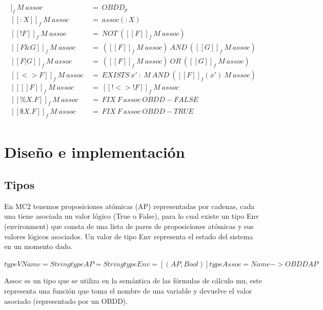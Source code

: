 \begin{align*}
[[p]]_{f}\ M\ assoc\ &=\ OBDD_{p} \\
[[:X]]_{f}\ M\ assoc\ &=\ assoc(:X) \\
[[!F]]_{f}\ M\ assoc\ &=\ NOT\ ([[F]]_{f}\ M\ assoc)\\
[[F \& G]]_{f}\ M\ assoc\ &=\ ([[F]]_{f}\ M\ assoc)\ AND\ ([[G]]_{f}\ M\ assoc)\\
[[F | G]]_{f}\ M\ assoc\ &=\ ([[F]]_{f}\ M\ assoc)\ OR\ ([[G]]_{f}\ M\ assoc)\\
[[<>F]]_{f}\ M\ assoc\ &=\ EXISTS\ x'\ :\ M\ AND\ ([[F]]_{f}(x')\ M\ assoc) \\
[[[]F]]_{f}\ M\ assoc\ &=\ [[!<>!F]]_{f}\ M\ assoc \\
[[\%X.F]]_{f}\ M\ assoc\ &=\ FIX\ F\ assoc\ OBDD-FALSE \\
[[\$X.F]]_{f}\ M\ assoc\ &=\ FIX\ F\ assoc\ OBDD-TRUE \\
\end{align*}




\section{Diseño e implementación}

\subsection{Tipos}
En MC2 tenemos proposiciones atómicas (AP) representadas por cadenas, cada una tiene asociada un valor lógico (True o False), para lo cual existe un tipo Env (environment) que consta de una lista de pares de proposiciones atómicas y sus valores lógicos asociados. Un valor de tipo Env representa el estado del sistema en un momento dado.

$type VName = String
type AP = String
type Env = [(AP,Bool)]
type Assoc = Name -> OBDD AP$

Assoc es un tipo que se utiliza en la semántica de las fórmulas de cálculo mu, este representa una función que toma el nombre de una variable y devuelve el valor asociado (representado por un OBDD).
